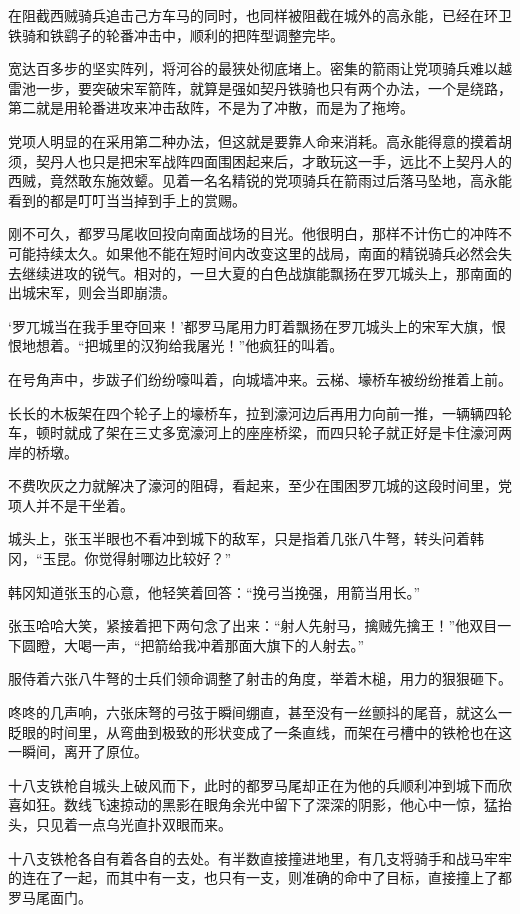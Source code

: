 在阻截西贼骑兵追击己方车马的同时，也同样被阻截在城外的高永能，已经在环卫铁骑和铁鹞子的轮番冲击中，顺利的把阵型调整完毕。

宽达百多步的坚实阵列，将河谷的最狭处彻底堵上。密集的箭雨让党项骑兵难以越雷池一步，要突破宋军箭阵，就算是强如契丹铁骑也只有两个办法，一个是绕路，第二就是用轮番进攻来冲击敌阵，不是为了冲散，而是为了拖垮。

党项人明显的在采用第二种办法，但这就是要靠人命来消耗。高永能得意的摸着胡须，契丹人也只是把宋军战阵四面围困起来后，才敢玩这一手，远比不上契丹人的西贼，竟然敢东施效颦。见着一名名精锐的党项骑兵在箭雨过后落马坠地，高永能看到的都是叮叮当当掉到手上的赏赐。

刚不可久，都罗马尾收回投向南面战场的目光。他很明白，那样不计伤亡的冲阵不可能持续太久。如果他不能在短时间内改变这里的战局，南面的精锐骑兵必然会失去继续进攻的锐气。相对的，一旦大夏的白色战旗能飘扬在罗兀城头上，那南面的出城宋军，则会当即崩溃。

‘罗兀城当在我手里夺回来！’都罗马尾用力盯着飘扬在罗兀城头上的宋军大旗，恨恨地想着。“把城里的汉狗给我屠光！”他疯狂的叫着。

在号角声中，步跋子们纷纷嚎叫着，向城墙冲来。云梯、壕桥车被纷纷推着上前。

长长的木板架在四个轮子上的壕桥车，拉到濠河边后再用力向前一推，一辆辆四轮车，顿时就成了架在三丈多宽濠河上的座座桥梁，而四只轮子就正好是卡住濠河两岸的桥墩。

不费吹灰之力就解决了濠河的阻碍，看起来，至少在围困罗兀城的这段时间里，党项人并不是干坐着。

城头上，张玉半眼也不看冲到城下的敌军，只是指着几张八牛弩，转头问着韩冈，“玉昆。你觉得射哪边比较好？”

韩冈知道张玉的心意，他轻笑着回答：“挽弓当挽强，用箭当用长。”

张玉哈哈大笑，紧接着把下两句念了出来：“射人先射马，擒贼先擒王！”他双目一下圆瞪，大喝一声，“把箭给我冲着那面大旗下的人射去。”

服侍着六张八牛弩的士兵们领命调整了射击的角度，举着木槌，用力的狠狠砸下。

咚咚的几声响，六张床弩的弓弦于瞬间绷直，甚至没有一丝颤抖的尾音，就这么一眨眼的时间里，从弯曲到极致的形状变成了一条直线，而架在弓槽中的铁枪也在这一瞬间，离开了原位。

十八支铁枪自城头上破风而下，此时的都罗马尾却正在为他的兵顺利冲到城下而欣喜如狂。数线飞速掠动的黑影在眼角余光中留下了深深的阴影，他心中一惊，猛抬头，只见着一点乌光直扑双眼而来。

十八支铁枪各自有着各自的去处。有半数直接撞进地里，有几支将骑手和战马牢牢的连在了一起，而其中有一支，也只有一支，则准确的命中了目标，直接撞上了都罗马尾面门。

